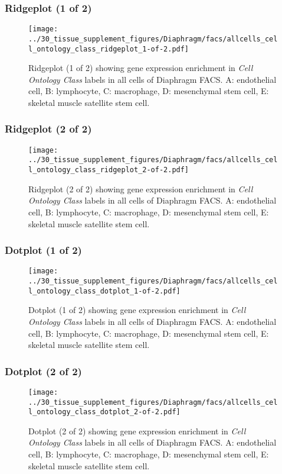 \subsubsection{Ridgeplot (1 of 2)}
\begin{figure}[h]
\centering
\texttt{[image: ../30\_tissue\_supplement\_figures/Diaphragm/facs/allcells\_cell\_ontology\_class\_ridgeplot\_1-of-2.pdf]}

\caption{ Ridgeplot (1 of 2)  showing gene expression enrichment in \emph{Cell Ontology Class} labels in all cells of Diaphragm FACS. A: endothelial cell, B: lymphocyte, C: macrophage, D: mesenchymal stem cell, E: skeletal muscle satellite stem cell.}
\end{figure}


\clearpage

\subsubsection{Ridgeplot (2 of 2)}
\begin{figure}[h]
\centering
\texttt{[image: ../30\_tissue\_supplement\_figures/Diaphragm/facs/allcells\_cell\_ontology\_class\_ridgeplot\_2-of-2.pdf]}

\caption{ Ridgeplot (2 of 2)  showing gene expression enrichment in \emph{Cell Ontology Class} labels in all cells of Diaphragm FACS. A: endothelial cell, B: lymphocyte, C: macrophage, D: mesenchymal stem cell, E: skeletal muscle satellite stem cell.}
\end{figure}


\clearpage

\subsubsection{Dotplot (1 of 2)}
\begin{figure}[h]
\centering
\texttt{[image: ../30\_tissue\_supplement\_figures/Diaphragm/facs/allcells\_cell\_ontology\_class\_dotplot\_1-of-2.pdf]}

\caption{ Dotplot (1 of 2)  showing gene expression enrichment in \emph{Cell Ontology Class} labels in all cells of Diaphragm FACS. A: endothelial cell, B: lymphocyte, C: macrophage, D: mesenchymal stem cell, E: skeletal muscle satellite stem cell.}
\end{figure}


\clearpage

\subsubsection{Dotplot (2 of 2)}
\begin{figure}[h]
\centering
\texttt{[image: ../30\_tissue\_supplement\_figures/Diaphragm/facs/allcells\_cell\_ontology\_class\_dotplot\_2-of-2.pdf]}

\caption{ Dotplot (2 of 2)  showing gene expression enrichment in \emph{Cell Ontology Class} labels in all cells of Diaphragm FACS. A: endothelial cell, B: lymphocyte, C: macrophage, D: mesenchymal stem cell, E: skeletal muscle satellite stem cell.}
\end{figure}


